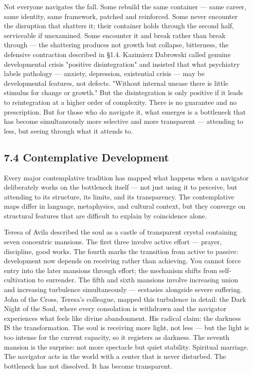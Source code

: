 Not everyone navigates the fall. Some rebuild the same container — same career, same identity, same framework, patched and reinforced. Some never encounter the disruption that shatters it; their container holds through the second half, serviceable if unexamined. Some encounter it and break rather than break through — the shattering produces not growth but collapse, bitterness, the defensive contraction described in §1.4. Kazimierz Dabrowski called genuine developmental crisis "positive disintegration" and insisted that what psychiatry labels pathology — anxiety, depression, existential crisis — may be developmental features, not defects. "Without internal unease there is little stimulus for change or growth." But the disintegration is only positive if it leads to reintegration at a higher order of complexity. There is no guarantee and no prescription. But for those who do navigate it, what emerges is a bottleneck that has become simultaneously more selective and more transparent — attending to less, but seeing through what it attends to.


\subsection*{7.4 Contemplative Development}


Every major contemplative tradition has mapped what happens when a navigator deliberately works on the bottleneck itself — not just using it to perceive, but attending to its structure, its limits, and its transparency. The contemplative maps differ in language, metaphysics, and cultural context, but they converge on structural features that are difficult to explain by coincidence alone.


Teresa of Avila described the soul as a castle of transparent crystal containing seven concentric mansions. The first three involve active effort — prayer, discipline, good works. The fourth marks the transition from active to passive: development now depends on receiving rather than achieving. You cannot force entry into the later mansions through effort; the mechanism shifts from self-cultivation to surrender. The fifth and sixth mansions involve increasing union and increasing turbulence simultaneously — ecstasies alongside severe suffering. John of the Cross, Teresa's colleague, mapped this turbulence in detail: the Dark Night of the Soul, where every consolation is withdrawn and the navigator experiences what feels like divine abandonment. His radical claim: the darkness IS the transformation. The soul is receiving more light, not less — but the light is too intense for the current capacity, so it registers as darkness. The seventh mansion is the surprise: not more spectacle but quiet stability. Spiritual marriage. The navigator acts in the world with a center that is never disturbed. The bottleneck has not dissolved. It has become transparent.


